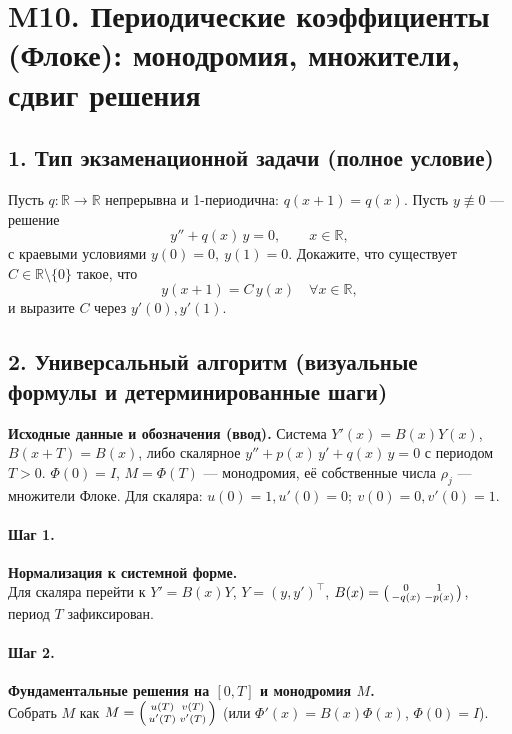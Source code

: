 \section{M10. Периодические коэффициенты (Флоке): монодромия, множители, сдвиг решения}

\subsection*{1. Тип экзаменационной задачи (полное условие)}
Пусть \(q:\mathbb R\to\mathbb R\) непрерывна и 1-периодична: \(q(x+1)=q(x)\).
Пусть \(y\not\equiv0\) — решение
\[
y''+q(x)\,y=0,\qquad x\in\mathbb R,
\]
с краевыми условиями \(y(0)=0,\ y(1)=0\).
Докажите, что существует \(C\in\mathbb R\setminus\{0\}\) такое, что
\[
y(x+1)=C\,y(x)\quad\forall x\in\mathbb R,
\]
и выразите \(C\) через \(y'(0),y'(1)\).

\subsection*{2. Универсальный алгоритм (визуальные формулы и детерминированные шаги)}

\textbf{Исходные данные и обозначения (ввод).}
Система \(Y'(x)=B(x)Y(x)\), \(B(x+T)=B(x)\), либо скалярное \(y''+p(x)\,y'+q(x)\,y=0\) с периодом \(T>0\).
\(\Phi(0)=I\), \(M=\Phi(T)\) — монодромия, её собственные числа \(\rho_j\) — множители Флоке.
Для скаляра: \(u(0)=1,u'(0)=0;\ v(0)=0,v'(0)=1\).

\paragraph{Шаг 1.} \textbf{Нормализация к системной форме.}\\
Для скаляра перейти к \(Y'=\!B(x)Y\), \(Y=(y,y')^\top\),
\(B(x)=\begin{psmallmatrix}0&1\\-q(x)&-p(x)\end{psmallmatrix}\), период \(T\) зафиксирован.

\paragraph{Шаг 2.} \textbf{Фундаментальные решения на \([0,T]\) и монодромия \(M\).}\\
Собрать \(M\) как
\(
M=\begin{psmallmatrix}u(T)&v(T)\\ u'(T)&v'(T)\end{psmallmatrix}
\)
(или \(\Phi'(x)=B(x)\Phi(x)\), \(\Phi(0)=I\)).


